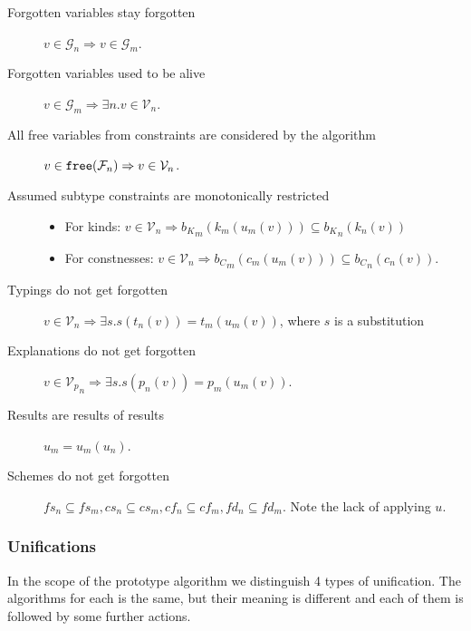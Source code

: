 \begin{description}
    \item[Forgotten variables stay forgotten] $v \in \mathcal{G}_n \Rightarrow v \in \mathcal{G}_m$.
    \item[Forgotten variables used to be alive] $v \in \mathcal{G}_m \Rightarrow \exists n . v \in \mathcal{V}_n$.
    \item[All free variables from constraints are considered by the algorithm] $v \in \mathtt{free} (\mathcal{F}_n) \Rightarrow v \in \mathcal{V}_n$.
    \item[Assumed subtype constraints are monotonically restricted] \quad
    \begin{itemize}
        \item For kinds: $v \in {\mathcal{V}}_n \Rightarrow {b_K}_m (k_m(u_m(v))) \subseteq {b_K}_n (k_n(v))$
        \item For constnesses: $v \in {\mathcal{V}}_n \Rightarrow {b_C}_m (c_m(u_m(v))) \subseteq {b_C}_n (c_n(v))$.
    \end{itemize}
    \item[Typings do not get forgotten] $v \in {\mathcal{V}}_n \Rightarrow \exists s . s (t_n(v)) = t_m(u_m (v))$, where $s$ is a substitution
    \item[Explanations do not get forgotten] $v \in {\mathcal{V}_p}_n \Rightarrow \exists s . s(p_n(v)) = p_m(u_m (v))$.
    \item[Results are results of results] $u_m = u_m (u_n)$.
    \item[Schemes do not get forgotten] $fs_n \subseteq fs_m, cs_n \subseteq cs_m, cf_n \subseteq  cf_m, fd_n \subseteq  fd_m$. Note the lack of applying $u$.
\end{description}

\subsubsection{Unifications}
\label{unifications}

In the scope of the prototype algorithm we distinguish 4 types of unification. The algorithms for each is the same, but their meaning is different and each of them is followed by some further actions.

